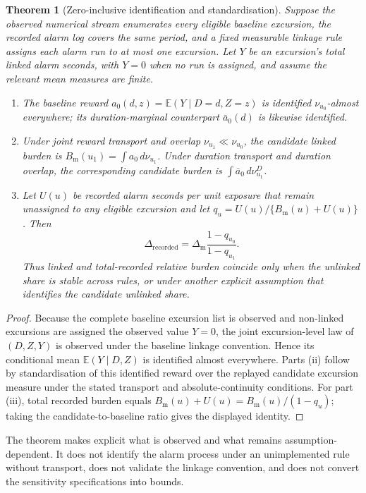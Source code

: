 \documentclass[11pt,letterpaper]{article}
\begin{document}
\newtheorem{theorem}{Theorem}
\begin{theorem}[Zero-inclusive identification and standardisation]\label{thm:supp-ident}
Suppose the observed numerical stream enumerates every eligible baseline excursion, the recorded alarm log covers the same period, and a fixed measurable linkage rule assigns each alarm run to at most one excursion. Let $Y$ be an excursion's total linked alarm seconds, with $Y=0$ when no run is assigned, and assume the relevant mean measures are finite.
\begin{enumerate}\itemsep2pt
\item[(i)] The baseline reward $a_0(d,z)=\mathbb E(Y\mid D=d,Z=z)$ is identified $\nu_{u_0}$-almost everywhere; its duration-marginal counterpart $\bar a_0(d)$ is likewise identified.
\item[(ii)] Under joint reward transport and overlap $\nu_{u_1}\ll\nu_{u_0}$, the candidate linked burden is $B_{\mathrm m}(u_1)=\int a_0\,d\nu_{u_1}$. Under duration transport and duration overlap, the corresponding candidate burden is $\int \bar a_0\,d\nu^D_{u_1}$.
\item[(iii)] Let $U(u)$ be recorded alarm seconds per unit exposure that remain unassigned to any eligible excursion and let $q_u=U(u)/\{B_{\mathrm m}(u)+U(u)\}$. Then
\[
\Delta_{\mathrm{recorded}}=\Delta_{\mathrm m}\frac{1-q_{u_0}}{1-q_{u_1}}.
\]
Thus linked and total-recorded relative burden coincide only when the unlinked share is stable across rules, or under another explicit assumption that identifies the candidate unlinked share.
\end{enumerate}
\end{theorem}

\begin{proof}
Because the complete baseline excursion list is observed and non-linked excursions are assigned the observed value $Y=0$, the joint excursion-level law of $(D,Z,Y)$ is observed under the baseline linkage convention. Hence its conditional mean $\mathbb E(Y\mid D,Z)$ is identified almost everywhere. Parts (ii) follow by standardisation of this identified reward over the replayed candidate excursion measure under the stated transport and absolute-continuity conditions. For part (iii), total recorded burden equals $B_{\mathrm m}(u)+U(u)=B_{\mathrm m}(u)/(1-q_u)$; taking the candidate-to-baseline ratio gives the displayed identity.
\end{proof}

The theorem makes explicit what is observed and what remains assumption-dependent. It does not identify the alarm process under an unimplemented rule without transport, does not validate the linkage convention, and does not convert the sensitivity specifications into bounds.


\end{document}
